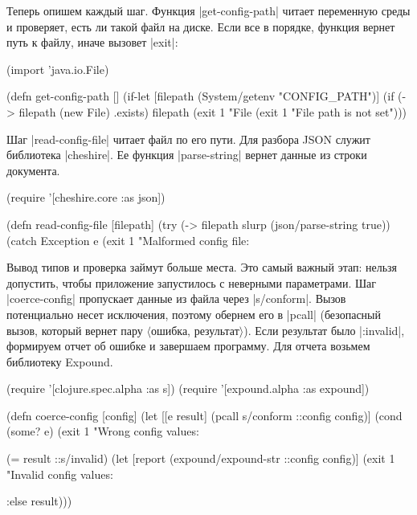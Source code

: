 Теперь опишем каждый шаг. Функция \spverb|get-config-path| читает переменную
среды и проверяет, есть ли такой файл на диске. Если все в порядке, функция
вернет путь к файлу, иначе вызовет \spverb|exit|:

\begin{english}
  \begin{clojure}
(import 'java.io.File)

(defn get-config-path []
  (if-let [filepath (System/getenv "CONFIG_PATH")]
    (if (-> filepath (new File) .exists)
      filepath
      (exit 1 "File %
    (exit 1 "File path is not set")))
  \end{clojure}
\end{english}

Шаг \spverb|read-config-file| читает файл по его пути. Для разбора JSON служит
библиотека \spverb|cheshire|. Ее функция \spverb|parse-string| вернет данные из
строки документа.

\begin{english}
  \begin{clojure}
(require '[cheshire.core :as json])

(defn read-config-file
  [filepath]
  (try
    (-> filepath slurp (json/parse-string true))
    (catch Exception e
      (exit 1 "Malformed config file: %
  \end{clojure}
\end{english}

Вывод типов и проверка займут больше места. Это самый важный этап: нельзя
допустить, чтобы приложение запустилось с неверными параметрами. Шаг
\spverb|coerce-config| пропускает данные из файла через
\spverb|s/conform|. Вызов потенциально несет исключения, поэтому обернем его в
\spverb|pcall| (безопасный вызов, который вернет пару $\langle$ошибка,
результат$\rangle$). Если результат было \spverb|:invalid|, формируем отчет об
ошибке и завершаем программу. Для отчета возьмем библиотеку Expound.

\begin{english}
  \begin{clojure}
(require '[clojure.spec.alpha :as s])
(require '[expound.alpha :as expound])

(defn coerce-config [config]
  (let [[e result] (pcall s/conform ::config config)]
    (cond
      (some? e)
      (exit 1 "Wrong config values: %

      (= result ::s/invalid)
      (let [report (expound/expound-str ::config config)]
        (exit 1 "Invalid config values: %

      :else result)))
  \end{clojure}
\end{english}

